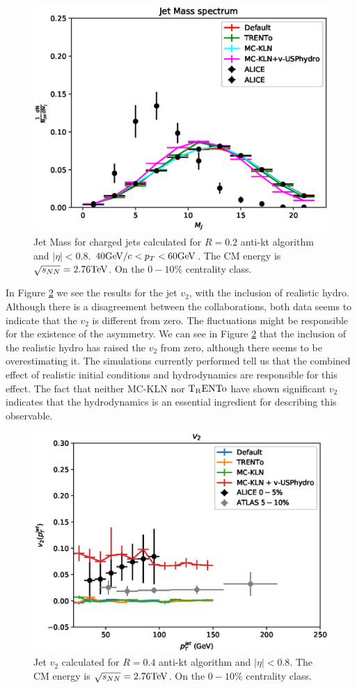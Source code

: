 \begin{figure}
\includegraphics[width=1.0\textwidth]{images/Mass_4.eps}
\caption[Jet Mass]{Jet Mass for charged jets calculated for $R=0.2$ anti-kt algorithm and $|\eta|<0.8$. $40 {\rm GeV/c} < p_T < 60 {\rm GeV}$. The CM energy is $\sqrt{s_{NN}}= 2.76 {\rm TeV}$. On the $0-10\%$ centrality class.}
\label{jet_mass}
\end{figure}

In Figure \ref{jet_v2} we see the results for the jet $v_2$, with the inclusion of realistic hydro. Although there is a disagreement between the collaborations, both data seems to indicate that the $v_2$ is different from zero. The fluctuations might be responsible for the existence of the asymmetry. We can see in Figure \ref{jet_v2} that the inclusion of the realistic hydro has raised the $v_2$ from zero, although there seems to be overestimating it. The simulations currently performed tell us that the combined effect of realistic initial conditions and hydrodynamics are responsible for this effect. The fact that neither MC-KLN nor $\rm T_RENTo$ have shown significant $v_2$ indicates that the hydrodynamics is an essential ingredient for describing this observable.

\begin{figure}
\includegraphics[width=1.0\textwidth]{images/v2_5.eps}
\caption[Jet $v_2$]{Jet $v_2$ calculated for $R=0.4$ anti-kt algorithm and $|\eta|<0.8$. The CM energy is $\sqrt{s_{NN}}= 2.76 {\rm TeV}$. On the $0-10\%$ centrality class.}
\label{jet_v2}
\end{figure}